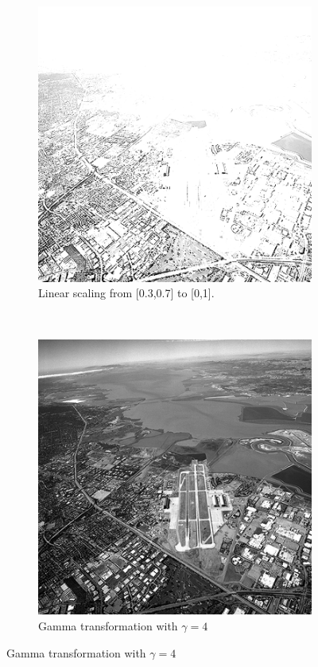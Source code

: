 \documentclass[a4paper]{article}
\begin{document}
\begin{figure}[H]
	\vspace{3mm}
	\begin{subfigure}[h]{0.48\textwidth}
		\centering
		\includegraphics[width=\textwidth]{linearContrast_output2}
		\caption*{Linear scaling from [0.3,0.7] to [0,1].}
	\end{subfigure}
	~
	\begin{subfigure}[h]{0.48\textwidth}
		\centering
		\includegraphics[width=\textwidth]{gammaContrast_output2}
		\caption*{Gamma transformation with $\gamma = 4$}
	\end{subfigure}
	

\end{figure}
\end{document}

